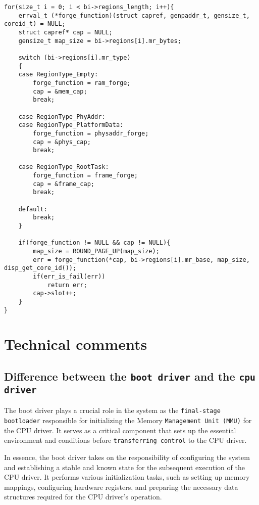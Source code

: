 \begin{lstlisting}[caption={Forging bootinfo capabilities},captionpos=b,frame=single,breaklines]
for(size_t i = 0; i < bi->regions_length; i++){
    errval_t (*forge_function)(struct capref, genpaddr_t, gensize_t, coreid_t) = NULL;
    struct capref* cap = NULL;
    gensize_t map_size = bi->regions[i].mr_bytes;

    switch (bi->regions[i].mr_type)
    {
    case RegionType_Empty:
        forge_function = ram_forge;
        cap = &mem_cap;
        break;

    case RegionType_PhyAddr:
    case RegionType_PlatformData:
        forge_function = physaddr_forge;
        cap = &phys_cap;
        break;

    case RegionType_RootTask:
        forge_function = frame_forge;
        cap = &frame_cap;
        break;

    default:
        break;
    }

    if(forge_function != NULL && cap != NULL){
        map_size = ROUND_PAGE_UP(map_size);
        err = forge_function(*cap, bi->regions[i].mr_base, map_size, disp_get_core_id());
        if(err_is_fail(err))
            return err;
        cap->slot++;
    }
}
\end{lstlisting}

\section{Technical comments}

\subsection{Difference between the \texttt{boot driver} and the \texttt{cpu driver}}

The boot driver plays a crucial role in the system as the \texttt{final-stage bootloader} responsible for initializing the Memory \texttt{Management Unit (MMU)} for the CPU driver. It serves as a critical component that sets up the essential environment and conditions before \texttt{transferring control} to the CPU driver.

In essence, the boot driver takes on the responsibility of configuring the system and establishing a stable and known state for the subsequent execution of the CPU driver. It performs various initialization tasks, such as setting up memory mappings, configuring hardware registers, and preparing the necessary data structures required for the CPU driver's operation.

